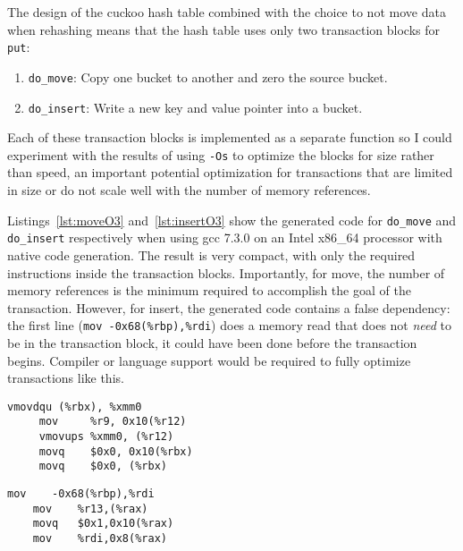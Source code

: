 The design of the cuckoo hash table combined with the choice to not move data
when rehashing means that the hash table uses only two transaction blocks for
\texttt{put}:
\begin{enumerate}
\item \texttt{do\_move}: Copy one bucket to another and zero the source bucket.
\item \texttt{do\_insert}: Write a new key and value pointer into a bucket.
\end{enumerate}
Each of these transaction blocks is implemented as a separate function so I
could experiment with the results of using \texttt{-Os} to optimize the blocks
for size rather than speed, an important potential optimization for
transactions that are limited in size or do not scale well with the number of
memory references.

Listings~\ref{lst:moveO3} and~\ref{lst:insertO3} show the generated code for
\texttt{do\_move} and \texttt{do\_insert} respectively when using gcc 7.3.0 on
an Intel x86\_64 processor with native code generation. The result is very
compact, with only the required instructions inside the transaction blocks.
Importantly, for move, the number of memory references is the minimum required to
accomplish the goal of the transaction. However, for insert, the generated code
contains a false dependency: the first line (\texttt{mov -0x68(\%rbp),\%rdi})
does a memory read that does not \textit{need} to be in the transaction block,
it could have been done before the transaction begins.
Compiler or language support would be required to fully optimize transactions
like this.


\begin{lstlisting}[caption={Transaction code generations for do\_move, optimized for speed.
Five instructions, five memory accesses (four writes).},label={lst:moveO3}]
     vmovdqu (%rbx), %xmm0
     mov     %r9, 0x10(%r12)
     vmovups %xmm0, (%r12)
     movq    $0x0, 0x10(%rbx)
     movq    $0x0, (%rbx)
\end{lstlisting}

\begin{lstlisting}[caption={Transaction code generation for do\_insert, optimized for speed.
Four instructions, four memory accesses (three writes).},label=lst:insertO3]
    mov    -0x68(%rbp),%rdi
    mov    %r13,(%rax)
    movq   $0x1,0x10(%rax)
    mov    %rdi,0x8(%rax)
\end{lstlisting}


